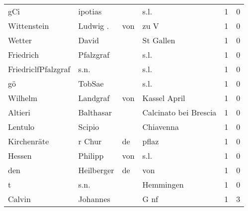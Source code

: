 \begin{tabular}{llllrr}
                      gCi &                            ipotias &             &                                        s.l. &          1 &         0 \\
              Wittenstein &                           Ludwig . &         von &                                        zu V &          1 &         0 \\
                   Wetter &                              David &             &                                   St Gallen &          1 &         0 \\
                Friedrich &                          Pfalzgraf &             &                                        s.l. &          1 &         0 \\
      FriedriclfPfalzgraf &                               s.n. &             &                                        s.l. &          1 &         0 \\
                       gö &                             TobSae &             &                                        s.l. &          1 &         0 \\
                  Wilhelm &                           Landgraf &         von &                                Kassel April &          1 &         0 \\
                  Altieri &                          Balthasar &             &                       Calcinato bei Brescia &          1 &         0 \\
                  Lentulo &                             Scipio &             &                                   Chiavenna &          1 &         0 \\
              Kirchenräte &                             r Chur &          de &                                       pflaz &          1 &         0 \\
                   Hessen &                            Philipp &         von &                                        s.l. &          1 &         0 \\
                      den &                         Heilberger &          de &                                         von &          1 &         0 \\
                        t &                               s.n. &             &                                   Hemmingen &          1 &         0 \\
                   Calvin &                           Johannes &             &                                        G nf &          1 &         3 \\

\end{tabular}

